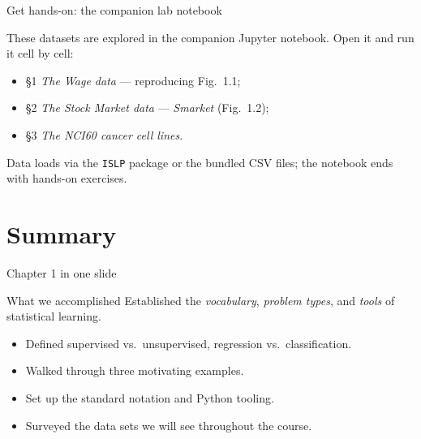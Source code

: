 \documentclass[aspectratio=169,11pt]{beamer}
\begin{document}
\begin{frame}{Get hands-on: the companion lab notebook}
  \begin{labnote}
    These datasets are explored in the companion Jupyter notebook. Open it and run it cell by cell:
    \begin{itemize}
      \item \S1 \emph{The Wage data} --- reproducing Fig.~1.1;
      \item \S2 \emph{The Stock Market data} --- \emph{Smarket} (Fig.~1.2);
      \item \S3 \emph{The NCI60 cancer cell lines}.
    \end{itemize}
    Data loads via the \texttt{ISLP} package or the bundled CSV files; the notebook ends with hands-on exercises.
  \end{labnote}
\end{frame}

\section{Summary}

\begin{frame}{Chapter 1 in one slide}
  \begin{block}{What we accomplished}
    Established the \emph{vocabulary}, \emph{problem types}, and
    \emph{tools} of statistical learning.
  \end{block}
  \begin{itemize}
    \item Defined supervised vs.\ unsupervised, regression vs.\
          classification.
    \item Walked through three motivating examples.
    \item Set up the standard notation and Python tooling.
    \item Surveyed the data sets we will see throughout the course.
  \end{itemize}
\end{frame}
\end{document}
